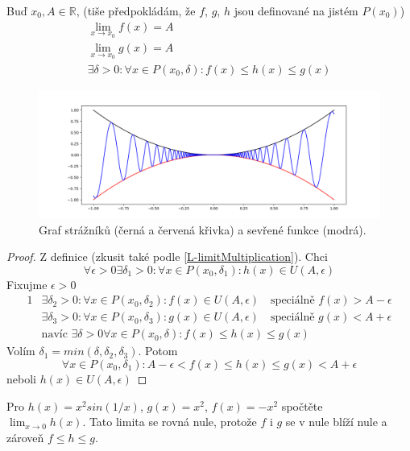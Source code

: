 \begin{theorem}[name=O strážnících, label=T-patrolmen]
    Buď $x_0, A\in\mathbb{R}$, (tiše předpokládám, že $f$, $g$, $h$ jsou definované na jistém $P(x_0)$)
    \begin{gather}
        \lim_{x\to x_0}f(x)=A \\
        \lim_{x\to x_0}g(x)=A \\
        \exists\delta>0:\forall x\in P(x_0,\delta):f(x)\leq h(x)\leq g(x)
    \end{gather}
    \begin{figure}[ht!]
        \begin{center}
            \includegraphics[width=\textwidth,keepaspectratio]{../img/chapter2/patrolmen.png}
            \caption{Graf strážníků (černá a červená křivka) a sevřené funkce (modrá).}
        \end{center}
    \end{figure}\FloatBarrier
\end{theorem}
\begin{proof}
    Z definice (zkusit také podle \autoref{L-limitMultiplication}). Chci
    \begin{equation}
        \forall\epsilon>0\exists\delta_1>0:\forall x\in P(x_0,\delta_1):h(x)\in U(A,\epsilon)
    \end{equation}
    Fixujme $\epsilon>0$
    \begin{alignat}{1}
        &\exists\delta_2>0:\forall x\in P(x_0,\delta_2):f(x)\in U(A,\epsilon)
            \quad\text{speciálně }f(x)>A-\epsilon \\
        &\exists\delta_3>0:\forall x\in P(x_0,\delta_3):g(x)\in U(A,\epsilon)
            \quad\text{speciálně }g(x)<A+\epsilon \\
        &\text{navíc }\exists\delta>0\forall x\in P(x_0,\delta):f(x)\leq h(x)\leq g(x)
    \end{alignat}
    Volím $\delta_1=min(\delta,\delta_2,\delta_3)$. Potom
    \begin{equation}
        \forall x\in P(x_0,\delta_1):A-\epsilon<f(x)\leq h(x)\leq g(x)<A+\epsilon
    \end{equation}
    neboli $h(x)\in U(A,\epsilon)$
\end{proof}
\begin{example}
    Pro $h(x)=x^2sin(1/x)$, $g(x)=x^2$, $f(x)=-x^2$ spočtěte \\ $\lim_{x\to 0}h(x)$.
    Tato limita se rovná nule, protože $f$ i $g$ se v nule blíží nule a zároveň $f\leq h\leq g$.
\end{example}

